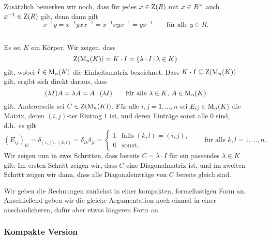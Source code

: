 Zusätzlich bemerken wir noch, dass für jedes $x \in \operatorname{Z}(R)$ mit $x \in {R}^\times$ auch $x^{-1} \in \operatorname{Z}(R)$ gilt, denn dann gilt
\[
    x^{-1} y
  = x^{-1} y x x^{-1}
  = x^{-1} x y x^{-1}
  = y x^{-1}
  \qquad
  \text{für alle $y \in R$}.
\]





\subsection{}
Es sei $K$ ein Körper.
Wir zeigen, dass
\[
    \operatorname{Z}(\operatorname{M}_{n}(K))
  = K \cdot I
  = \{\lambda \cdot I \,|\, \lambda \in K\}
\]
gilt, wobei $I \in \operatorname{M}_{n}(K)$ die Einheitsmatrix bezeichnet.
Dass $K \cdot I \subseteq \operatorname{Z}(\operatorname{M}_{n}(K))$ gilt, ergibt sich direkt daraus, dass
\[
    (\lambda I) A
  = \lambda A
  = A \cdot (\lambda I)
  \qquad
  \text{für alle $\lambda \in K$, $A \in \operatorname{M}_{n}(K)$}
\]
gilt.
Andererseits sei $C \in \operatorname{Z}(\operatorname{M}_{n}(K))$.
Für alle $i,j = 1, \dotsc, n$ sei $E_{ij} \in \operatorname{M}_{n}(K)$ die Matrix, deren $(i,j)$-ter Eintrag $1$ ist, und deren Einträge sonst alle $0$ sind, d.h.\ es gilt
\[
    (E_{ij})_{kl}
  = \delta_{(i,j), (k,l)}
  = \delta_{ik} \delta_{jl}
  = \begin{cases}
      1 & \text{falls $(k,l) = (i,j)$}, \\
      0 & \text{sonst},
    \end{cases}
    \qquad
    \text{für alle $k,l = 1, \dotsc, n$}.
\]
Wir zeigen nun in zwei Schritten, dass bereits $C = \lambda \cdot I$ für ein passendes $\lambda \in K$ gilt:
Im ersten Schritt zeigen wir, dass $C$ eine Diagonalmatrix ist, und im zweiten Schritt zeigen wir dann, dass alle Diagonaleinträge von $C$ bereits gleich sind.

Wir geben die Rechnungen zunächst in einer kompakten, formellastigen Form an.
Anschließend geben wir die gleiche Argumentation noch einmal in einer anschaulicheren, dafür aber etwas längeren Form an.



\subsubsection{Kompakte Version}

